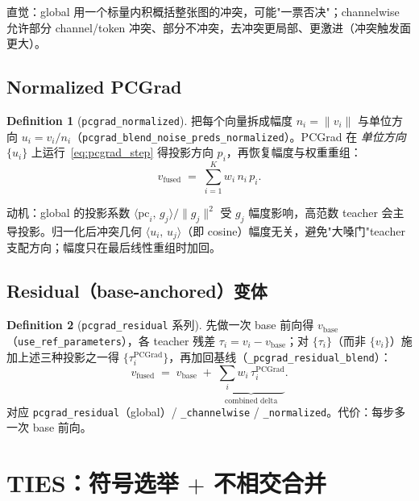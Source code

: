 \documentclass[11pt,a4paper]{article}
\newcommand{\PC}{\mathrm{PCGrad}}
\newcommand{\vb}{v_{\mathrm{base}}}
\newcommand{\vfused}{v_{\mathrm{fused}}}
\newcommand{\inner}[2]{\langle #1,\, #2\rangle}
\newcommand{\norm}[1]{\lVert #1\rVert}
\theoremstyle{plain}
\theoremstyle{definition}
\newtheorem{definition}{Definition}
\begin{document}
直觉：global 用一个标量内积概括整张图的冲突，可能"一票否决"；channelwise 允许部分 channel/token 冲突、部分不冲突，去冲突更局部、更激进（冲突触发面更大）。

\subsection{Normalized PCGrad}

\begin{definition}[\texttt{pcgrad\_normalized}]
\label{def:normalized}
把每个向量拆成幅度 $n_i=\norm{v_i}$ 与单位方向 $u_i=v_i/n_i$（\texttt{pcgrad\_blend\_noise\_preds\_normalized}）。PCGrad 在 \emph{单位方向} $\{u_i\}$ 上运行~\eqref{eq:pcgrad_step} 得投影方向 $p_i$，再恢复幅度与权重重组：
\begin{equation}
\vfused \;=\; \sum_{i=1}^{K} w_i\, n_i\, p_i.
\label{eq:normalized}
\end{equation}
\end{definition}

动机：global 的投影系数 $\inner{\mathrm{pc}_i}{g_j}/\norm{g_j}^2$ 受 $g_j$ 幅度影响，高范数 teacher 会主导投影。归一化后冲突几何 $\inner{u_i}{u_j}$（即 cosine）幅度无关，避免"大嗓门"teacher 支配方向；幅度只在最后线性重组时加回。

\subsection{Residual（base-anchored）变体}

\begin{definition}[\texttt{pcgrad\_residual} 系列]
\label{def:residual}
先做一次 base 前向得 $\vb$（\texttt{use\_ref\_parameters}），各 teacher 残差 $\tau_i=v_i-\vb$；对 $\{\tau_i\}$（而非 $\{v_i\}$）施加上述三种投影之一得 $\{\tau_i^{\PC}\}$，再加回基线（\texttt{\_pcgrad\_residual\_blend}）：
\begin{equation}
\vfused \;=\; \vb \;+\; \underbrace{\textstyle\sum_i w_i\,\tau_i^{\PC}}_{\text{combined delta}}.
\label{eq:residual}
\end{equation}
对应 \texttt{pcgrad\_residual}（global）/ \texttt{\_channelwise} / \texttt{\_normalized}。代价：每步多一次 base 前向。
\end{definition}

\section{TIES：符号选举 $+$ 不相交合并}
\end{document}

